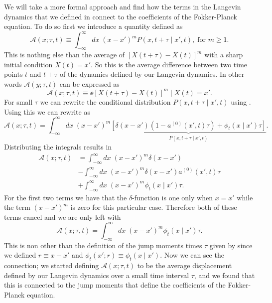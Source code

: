 We will take a more formal approach and find how the terms in the Langevin
dynamics that we defined in  connect to the
coefficients of the Fokker-Planck equation. To do so first we introduce a
quantity defined as
\begin{equation}
    \mathcal{A}(x; \tau, t) \equiv \int_{-\infty}^\infty dx\;
    (x - x')^m P(x, t + \tau \mid x', t), \; \text{for } m \geq 1.
    \label{eq_compute_jump_mom}
\end{equation}
This is nothing else than the average of $[X(t + \tau) - X(t)]^m$ with a sharp
initial condition $X(t) = x'$. So this is the average difference between two
time points $t$ and $t + \tau$ of the dynamics defined by our Langevin
dynamics. In other words $\mathcal{A}(y; \tau, t)$ can be expressed as
\begin{equation}
    \mathcal{A}(x; \tau, t) \equiv 
    \ee{\left[X(t + \tau) - X(t)\right]^m \mid X(t) = x'}.
\end{equation}
For small $\tau$ we can rewrite the conditional distribution $P(x, t + \tau
\mid x', t)$ using . Using this we can rewrite
 as
\begin{equation}
    \mathcal{A}(x; \tau, t) = \int_{-\infty}^\infty dx\; (x - x')^m
    \underbrace{
    \left[ \delta(x - x') \left( 1 - a^{(0)}(x', t) \tau \right) +
    \phi_t(x \mid x')\tau \right]
    }_{P(x, t + \tau \mid x', t)}.
\end{equation}
Distributing the integrals results in
\begin{align}
    \mathcal{A}(x; \tau, t) &= 
    \int_{-\infty}^\infty dx\; (x - x')^m \delta(x - x') \\
    &- \int_{-\infty}^\infty dx\; (x - x')^m \delta(x - x') a^{(0)}(x', t) 
    \tau \\ 
    &+ \int_{-\infty}^\infty dx\; (x - x')^m \phi_t(x \mid x') \tau.
\end{align}
For the first two terms we have that the $\delta$-function is one only when $x
= x'$ while the term $(x - x')^m$ is zero for this particular case. Therefore
both of these terms cancel and we are only left with
\begin{equation}
    \mathcal{A}(x; \tau, t) = \int_{-\infty}^\infty dx\; (x - x')^m 
    \phi_t(x \mid x') \tau.
\end{equation}
This is non other than the definition of the jump moments times $\tau$ given by
 since we defined $r \equiv x - x'$ and $\phi_t(x'; r) \equiv
\phi_t(x \mid x')$. Now we can see the connection; we started defining
$\mathcal{A}(x; \tau, t)$ to be the average displacement defined by our
Langevin dynamics over a small time interval $\tau$, and we found that this is
connected to the jump moments that define the coefficients of the Fokker-Planck
equation.